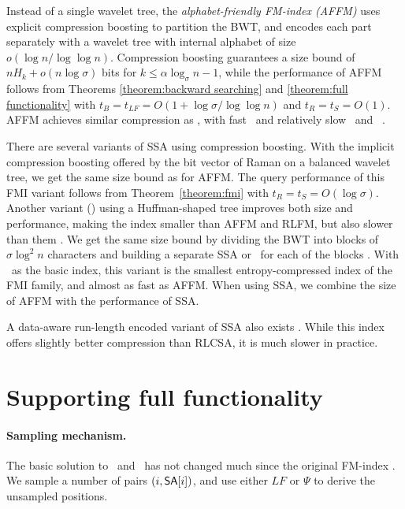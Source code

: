 Instead of a single wavelet tree, the \emph{alphabet-friendly FM-index (AFFM)} \cite{Ferragina2007a} uses explicit compression boosting to partition the BWT, and encodes each part separately with a wavelet tree with internal alphabet of size $o(\log n / \log \log n)$. Compression boosting guarantees a size bound of $nH_{k} + o(n \log \sigma)$ bits for $k \le \alpha \log_{\sigma} n - 1$, while the performance of AFFM follows from Theorems \ref{theorem:backward searching} and \ref{theorem:full functionality} with $t_{B} = t_{LF} = O(1 + \log \sigma / \log \log n)$ and $t_{R} = t_{S} = O(1)$. AFFM achieves similar compression as \sadcsa, with fast \find\ and relatively slow \locate\ and \extract\ \cite{Ferragina2009a}.

There are several variants of SSA using compression boosting. With the implicit compression boosting offered by the bit vector of Raman  on a balanced wavelet tree, we get the same size bound as for AFFM. The query performance of this FMI variant follows from Theorem~\ref{theorem:fmi} with $t_{R} = t_{S} = O(\log \sigma)$. Another variant (\ssarrr) using a Huffman-shaped tree improves both size and performance, making the index smaller than AFFM and RLFM, but also slower than them \cite{Claude2008}. We get the same size bound by dividing the BWT into blocks of $\sigma \log^{2} n$ characters and building a separate SSA or \ssarrr\ for each of the blocks \cite{Kaerkkaeinen2011}. With \ssarrr\ as the basic index, this variant is the smallest entropy-compressed index of the FMI family, and almost as fast as AFFM. When using SSA, we combine the size of AFFM with the performance of SSA. 

A data-aware run-length encoded variant of SSA also exists \cite{Maekinen2010}. While this index offers slightly better compression than RLCSA, it is much slower in practice.


\section{Supporting full functionality}\label{sect:full functionality}

\paragraph{Sampling mechanism.}

The basic solution to \locate\ and \extract\ has not changed much since the original FM-index \cite{Ferragina2005a}. We sample a number of pairs $(i, \mathsf{SA}[i])$, and use either $LF$ or $\Psi$ to derive the unsampled positions.

